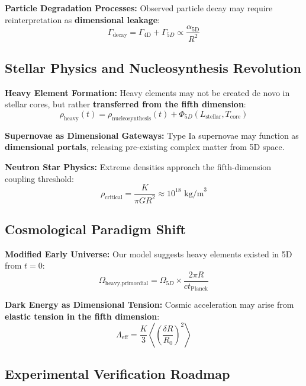 \documentclass[10pt]{article}
\begin{document}
\textbf{Particle Degradation Processes:} Observed particle decay may require reinterpretation as \textbf{dimensional leakage}:
\begin{equation}
\Gamma_{\text{decay}} = \Gamma_{\text{4D}} + \Gamma_{5D} \propto \frac{\alpha_{\text{5D}}}{R^2}
\end{equation}

\subsection{Stellar Physics and Nucleosynthesis Revolution}

\textbf{Heavy Element Formation:} Heavy elements may not be created de novo in stellar cores, but rather \textbf{transferred from the fifth dimension}:
\begin{equation}
\rho_{\text{heavy}}(t) = \rho_{\text{nucleosynthesis}}(t) + \Phi_{5D}(L_{\text{stellar}}, T_{\text{core}})
\end{equation}

\textbf{Supernovae as Dimensional Gateways:} Type Ia supernovae may function as \textbf{dimensional portals}, releasing pre-existing complex matter from 5D space.

\textbf{Neutron Star Physics:} Extreme densities approach the fifth-dimension coupling threshold:
\begin{equation}
\rho_{\text{critical}} = \frac{K}{\pi G R^2} \approx 10^{18} \text{ kg/m}^3
\end{equation}

\subsection{Cosmological Paradigm Shift}

\textbf{Modified Early Universe:} Our model suggests heavy elements existed in 5D from $t = 0$:
\begin{equation}
\Omega_{\text{heavy,primordial}} = \Omega_{5D} \times \frac{2\pi R}{c t_{\text{Planck}}}
\end{equation}

\textbf{Dark Energy as Dimensional Tension:} Cosmic acceleration may arise from \textbf{elastic tension in the fifth dimension}:
\begin{equation}
\Lambda_{\text{eff}} = \frac{K}{3} \left\langle\left(\frac{\delta R}{R_0}\right)^2\right\rangle
\end{equation}

\subsection{Experimental Verification Roadmap}
\end{document}
